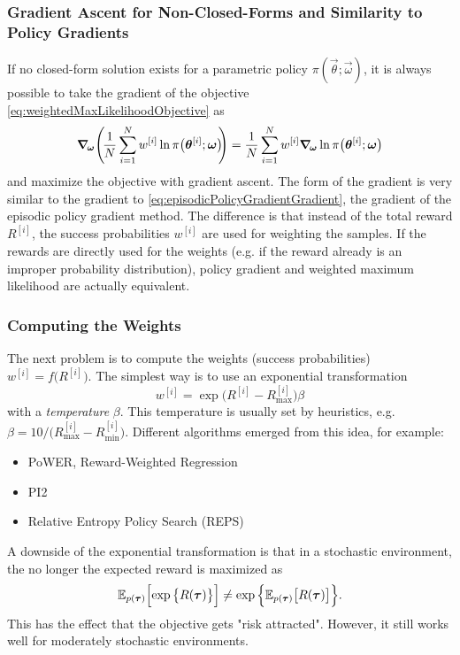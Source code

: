 			\subsubsection{Gradient Ascent for Non-Closed-Forms and Similarity to Policy Gradients}
				If no closed-form solution exists for a parametric policy \( \pi(\vec{\theta}; \vec{\omega}) \), it is always possible to take the gradient of the objective \eqref{eq:weightedMaxLikelihoodObjective} as
				\begin{equation*}
					\grad_{\!\bm{\omega}}\Bigg(\! \frac{1}{N} \sum_{i = 1}^{N} w^{[i]} \ln \pi\big(\bm{\theta}^{[i]}; \bm{\omega}\big) \!\!\Bigg)
						= \frac{1}{N} \sum_{i = 1}^{N} w^{[i]} \grad_{\!\bm{\omega}} \ln \pi\big(\bm{\theta}^{[i]}; \bm{\omega}\big)
				\end{equation*}
				and maximize the objective with gradient ascent. The form of the gradient is very similar to the gradient to \eqref{eq:episodicPolicyGradientGradient}, the gradient of the episodic policy gradient method. The difference is that instead of the total reward \( R^{[i]} \), the success probabilities \( w^{[i]} \) are used for weighting the samples. If the rewards are directly used for the weights (e.g. if the reward already is an improper probability distribution), policy gradient and weighted maximum likelihood are actually equivalent.

			\subsubsection{Computing the Weights}
				The next problem is to compute the weights (success probabilities) \( w^{[i]} = f\big(R^{[i]}\big) \). The simplest way is to use an exponential transformation
				\begin{equation*}
					w^{[i]} = \exp{ \big( R^{[i]} - R^{[i]}_\mathrm{max} \big) \beta }
				\end{equation*}
				with a \emph{temperature} \( \beta \). This temperature is usually set by heuristics, e.g. \( \beta = 10 / \big( R^{[i]}_\mathrm{max} - R^{[i]}_\mathrm{min} \big) \). Different algorithms emerged from this idea, for example:
				\begin{itemize}
					\item {}   PoWER, Reward-Weighted Regression
					\item {} PI2
					\item Relative Entropy Policy Search (REPS)
				\end{itemize}
				A downside of the exponential transformation is that in a stochastic environment, the no longer the expected reward is maximized as
				\begin{equation*}
					\mathbb{E}_{p(\bm{\tau})}\Big[\! \exp\big\{R(\bm{\tau})\big\} \Big] \neq \exp\Big\{ \mathbb{E}_{p(\bm{\tau})}\big[ R(\bm{\tau}) \big] \Big\}.
				\end{equation*}
				This has the effect that the objective gets "risk attracted". However, it still works well for moderately stochastic environments.

